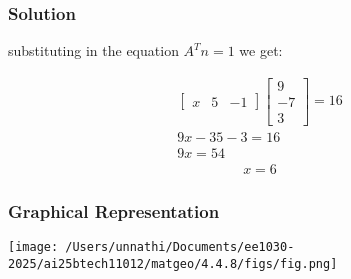 \documentclass{beamer}
\begin{document}
\begin{frame}
\frametitle{Solution}
substituting in the equation $A^{T}n =1 $ we get:

\begin{align}
    \begin{bmatrix}x & 5 &-1\end{bmatrix}\begin{bmatrix}9\\-7\\3\end{bmatrix} = 16\\
    9x - 35 - 3 = 16 \\
    9x = 54
\end{align}
\begin{align}
    x = 6
\end{align}

\end{frame}

\begin{frame}

\frametitle{Graphical Representation}
\begin{center}
\texttt{[image: /Users/unnathi/Documents/ee1030-2025/ai25btech11012/matgeo/4.4.8/figs/fig.png]}
\end{center}
\end{frame}
\end{document}
